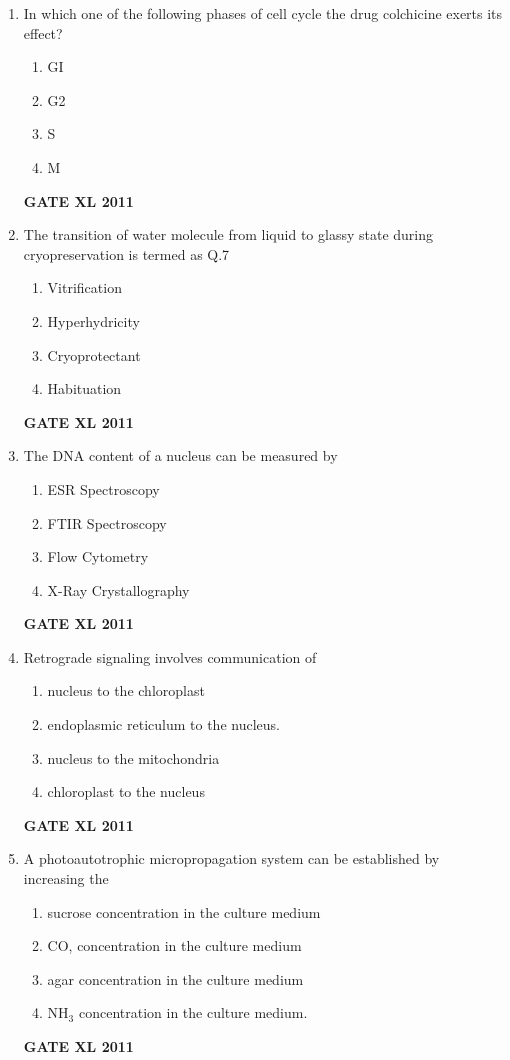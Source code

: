 \documentclass[journal,12pt,onecolumn]{IEEEtran}
\begin{document}
\begin{enumerate}
	\item {In which one of the following phases of cell cycle the drug colchicine exerts its effect?}

		\begin{enumerate}
			\item GI
			\item G2
			\item S
			\item M
		\end{enumerate}
		\hfill{\textbf{GATE XL 2011}}

\item {The transition of water molecule from liquid to glassy state during cryopreservation is termed as Q.7}
		\begin{enumerate}
			\item Vitrification
			\item Hyperhydricity
			\item Cryoprotectant
			\item Habituation
		\end{enumerate}
		\hfill{\textbf{GATE XL 2011}}

	\item {The DNA content of a nucleus can be measured by}
		\begin{enumerate}
			\item ESR Spectroscopy
			\item FTIR Spectroscopy
			\item Flow Cytometry
			\item X-Ray Crystallography
		\end{enumerate}
		\hfill{\textbf{GATE XL 2011}}

\item {Retrograde signaling involves communication of}
	\begin{enumerate}
			\item nucleus to the chloroplast
			\item endoplasmic reticulum to the nucleus.
			\item nucleus to the mitochondria
			\item chloroplast to the nucleus
		\end{enumerate}
		\hfill{\textbf{GATE XL 2011}}

\item {A photoautotrophic micropropagation system can be established by increasing the}
		\begin{enumerate}
			\item sucrose concentration in the culture medium
			\item CO, concentration in the culture medium
			\item agar concentration in the culture medium
			\item NH$_3$ concentration in the culture medium.
		\end{enumerate}
		\hfill{\textbf{GATE XL 2011}}


\end{enumerate}
\end{document}
